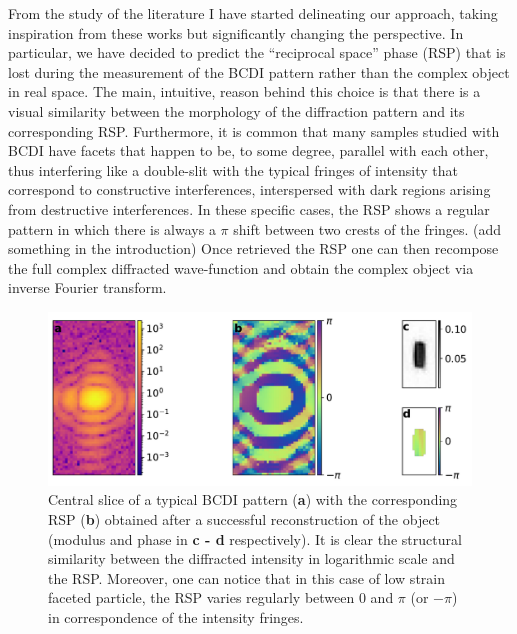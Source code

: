 From the study of the literature I have started delineating our approach, taking inspiration from these works but 
significantly changing the perspective. In particular, we have decided to predict the ``reciprocal space'' phase (RSP) that is 
lost during the measurement of the BCDI pattern rather than the complex object in real space.
The main, intuitive, reason behind this choice is that there is a visual 
similarity between the morphology of the diffraction pattern and its corresponding RSP. 
Furthermore, it is common that many samples studied with BCDI have facets that happen to be, to some degree, parallel with each other, 
thus interfering like a double-slit with the typical fringes of intensity that correspond to constructive interferences, 
interspersed with dark regions arising from destructive interferences. In these specific cases, the RSP shows a regular 
pattern in which there is always a $\pi$ shift between two crests of the fringes. (add something in the introduction)
Once retrieved the RSP one can then recompose the full complex diffracted wave-function and obtain the complex object via 
inverse Fourier transform.\\

\begin{figure}[H]
    \centering
    \includegraphics[width=.8\textwidth]{figures/Phasing/rec_space_phase.pdf}
    \caption{Central slice of a typical BCDI pattern (\textbf{a}) with the corresponding RSP (\textbf{b}) obtained after a 
    successful reconstruction of the object (modulus and phase in \textbf{c - d} respectively). It is clear the structural similarity between the diffracted intensity 
    in logarithmic scale and the RSP. Moreover, one can notice that in this case of low strain faceted particle, 
     the RSP varies regularly between 0 and $\pi$ (or $-\pi$) in correspondence of the intensity fringes. }
    \label{fig:rec_space_phase}
\end{figure}

